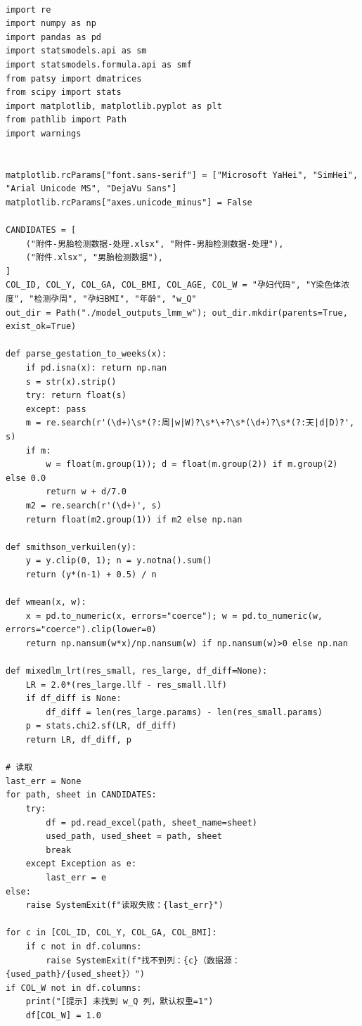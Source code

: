 \begin{lstlisting}

import re
import numpy as np
import pandas as pd
import statsmodels.api as sm
import statsmodels.formula.api as smf
from patsy import dmatrices
from scipy import stats
import matplotlib, matplotlib.pyplot as plt
from pathlib import Path
import warnings


matplotlib.rcParams["font.sans-serif"] = ["Microsoft YaHei", "SimHei", "Arial Unicode MS", "DejaVu Sans"]
matplotlib.rcParams["axes.unicode_minus"] = False

CANDIDATES = [
    ("附件-男胎检测数据-处理.xlsx", "附件-男胎检测数据-处理"),
    ("附件.xlsx", "男胎检测数据"),
]
COL_ID, COL_Y, COL_GA, COL_BMI, COL_AGE, COL_W = "孕妇代码", "Y染色体浓度", "检测孕周", "孕妇BMI", "年龄", "w_Q"
out_dir = Path("./model_outputs_lmm_w"); out_dir.mkdir(parents=True, exist_ok=True)

def parse_gestation_to_weeks(x):
    if pd.isna(x): return np.nan
    s = str(x).strip()
    try: return float(s)
    except: pass
    m = re.search(r'(\d+)\s*(?:周|w|W)?\s*\+?\s*(\d+)?\s*(?:天|d|D)?', s)
    if m:
        w = float(m.group(1)); d = float(m.group(2)) if m.group(2) else 0.0
        return w + d/7.0
    m2 = re.search(r'(\d+)', s)
    return float(m2.group(1)) if m2 else np.nan

def smithson_verkuilen(y):
    y = y.clip(0, 1); n = y.notna().sum()
    return (y*(n-1) + 0.5) / n

def wmean(x, w):
    x = pd.to_numeric(x, errors="coerce"); w = pd.to_numeric(w, errors="coerce").clip(lower=0)
    return np.nansum(w*x)/np.nansum(w) if np.nansum(w)>0 else np.nan

def mixedlm_lrt(res_small, res_large, df_diff=None):
    LR = 2.0*(res_large.llf - res_small.llf)
    if df_diff is None:
        df_diff = len(res_large.params) - len(res_small.params)
    p = stats.chi2.sf(LR, df_diff)
    return LR, df_diff, p

# 读取
last_err = None
for path, sheet in CANDIDATES:
    try:
        df = pd.read_excel(path, sheet_name=sheet)
        used_path, used_sheet = path, sheet
        break
    except Exception as e:
        last_err = e
else:
    raise SystemExit(f"读取失败：{last_err}")

for c in [COL_ID, COL_Y, COL_GA, COL_BMI]:
    if c not in df.columns:
        raise SystemExit(f"找不到列：{c}（数据源：{used_path}/{used_sheet}）")
if COL_W not in df.columns:
    print("[提示] 未找到 w_Q 列，默认权重=1")
    df[COL_W] = 1.0


\end{lstlisting}
